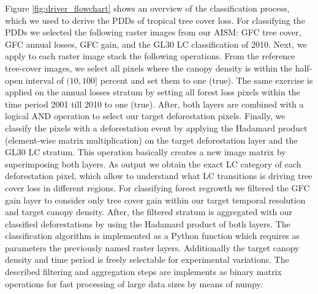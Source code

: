 			Figure \ref{fig:driver_flowchart} shows an overview of the classification process, which we used to derive the \acp{PDD} of tropical tree cover loss. For classifying the \acp{PDD} we selected the following raster images from our \ac{AISM}: \ac{GFC} tree cover, \ac{GFC} annual losses, \ac{GFC} gain, and the \ac{GL30} \ac{LC} classification of 2010. Next, we apply to each raster image stack the following operations. From the reference tree-cover images, we select all pixels where the canopy density is within the half-open interval of $(10,100]$ percent and set them to one (true). The same exercise is applied on the annual losses stratum by setting all forest loss pixels within the time period 2001 till 2010 to one (true). After, both layers are combined with a logical AND operation to select our target deforestation pixels. Finally, we classify the pixels with a deforestation event by applying the Hadamard product (element-wise matrix multiplication) on the target deforestation layer and the \ac{GL30} \ac{LC} stratum. This operation basically creates a new image matrix by superimposing both layers. As output we obtain the exact \ac{LC} category of each deforestation pixel, which allow to understand what \ac{LC} transitions is driving tree cover loss in different regions. For classifying forest regrowth we filtered the \ac{GFC} gain layer to consider only tree cover gain within our target temporal resolution and target canopy density. After, the filtered stratum is aggregated with our classified deforestations by using the Hadamard product of both layers. The classification algorithm is implemented as a Python function which requires as parameters the previously named raster layers. Additionally the target canopy density and time period is freely selectable for experimental variations. The described filtering and aggregation steps are implements as binary matrix operations for fast processing of large data sizes by means of numpy.
